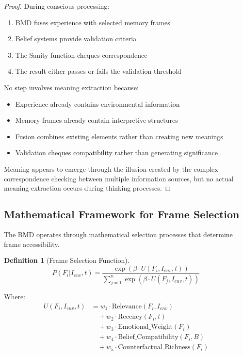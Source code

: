 \documentclass[12pt,a4paper]{article}
\newtheorem{definition}[theorem]{Definition}
\begin{document}
\begin{proof}
During conscious processing:
\begin{enumerate}
\item BMD fuses experience with selected memory frames
\item Belief systems provide validation criteria
\item The Sanity function cheques correspondence
\item The result either passes or fails the validation threshold
\end{enumerate}

No step involves meaning extraction because:
\begin{itemize}
\item Experience already contains environmental information
\item Memory frames already contain interpretive structures
\item Fusion combines existing elements rather than creating new meanings
\item Validation cheques compatibility rather than generating significance
\end{itemize}

Meaning appears to emerge through the illusion created by the complex correspondence checking between multiple information sources, but no actual meaning extraction occurs during thinking processes.
\end{proof}

\subsection{Mathematical Framework for Frame Selection}

The BMD operates through mathematical selection processes that determine frame accessibility.

\begin{definition}[Frame Selection Function]
$$P(F_i | I_{env}, t) = \frac{\exp(\beta \cdot U(F_i, I_{env}, t))}{\sum_{j=1}^{n} \exp(\beta \cdot U(F_j, I_{env}, t))}$$
\end{definition}

Where:
\begin{align}
U(F_i, I_{env}, t) &= w_1 \cdot \text{Relevance}(F_i, I_{env}) \\
&\quad + w_2 \cdot \text{Recency}(F_i, t) \\
&\quad + w_3 \cdot \text{Emotional\_Weight}(F_i) \\
&\quad + w_4 \cdot \text{Belief\_Compatibility}(F_i, B) \\
&\quad + w_5 \cdot \text{Counterfactual\_Richness}(F_i)
\end{align}
\end{document}
